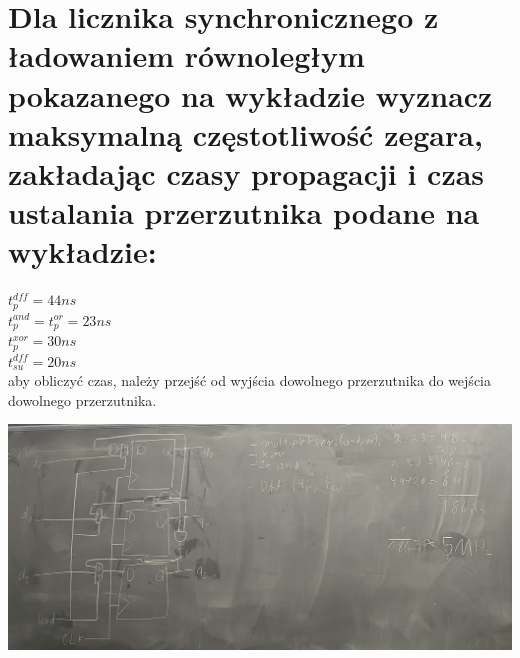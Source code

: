 \documentclass{article}
\begin{document}
\section{Dla licznika synchronicznego z ładowaniem równoległym pokazanego na wykładzie wyznacz maksymalną częstotliwość zegara, zakładając czasy propagacji i czas ustalania przerzutnika podane na wykładzie:}
$t^{dff}_p = 44 ns$\\
$t^{and}_p = t^{or}_p = 23 ns$\\
$t^{xor}_p = 30 ns$\\
$t^{dff}_{su} = 20 ns$\\
aby obliczyć czas, należy przejść od wyjścia dowolnego przerzutnika do wejścia dowolnego przerzutnika.\\
\begin{center}
\includegraphics[scale=0.1]{./L06Z07.jpg}
\end{center}
\end{document}
